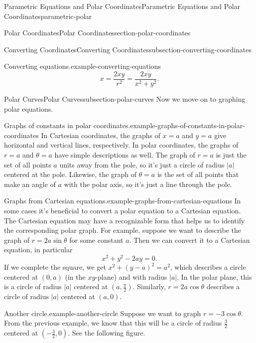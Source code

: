 \documentclass[oneside,10pt,]{book}
\numberwithin{equation}{section}
\begin{document}
\begin{chapterptx}{Parametric Equations and Polar Coordinates}{}{Parametric Equations and Polar Coordinates}{}{}{parametric-polar}
\begin{sectionptx}{Polar Coordinates}{}{Polar Coordinates}{}{}{section-polar-coordinates}
\begin{subsectionptx}{Converting Coordinates}{}{Converting Coordinates}{}{}{subsection-converting-coordinates}
\begin{example}{Converting equations.}{example-converting-equations}
\begin{equation*}
x = \frac{2xy}{r^{2}} = \frac{2xy}{x^{2}+y^{2}}.
\end{equation*}
\end{example}
\end{subsectionptx}
%
%
\typeout{************************************************}
\typeout{************************************************}
%
\begin{subsectionptx}{Polar Curves}{}{Polar Curves}{}{}{subsection-polar-curves}
\hypertarget{p-1027}{}%
Now we move on to graphing polar equations.%
\begin{example}{Graphs of constants in polar coordinates.}{example-graphs-of-constants-in-polar-coordinates}%
\hypertarget{p-1028}{}%
In Cartesian coordinates, the graphs of \(x=a\) and \(y=a\) give horizontal and vertical lines, respectively. In polar coordinates, the graphs of \(r=a\) and \(\theta=a\) have simple descriptions as well. The graph of \(r=a\) is just the set of all points \(a\) units away from the pole, so it's just a circle of radius \(|a|\) centered at the pole. Likewise, the graph of \(\theta = a\) is the set of all points that make an angle of \(a\) with the polar axis, so it's just a line through the pole.%
\end{example}
\begin{example}{Graphs from Cartesian equations.}{example-graphs-from-cartesian-equations}%
\hypertarget{p-1029}{}%
In some cases it's beneficial to convert a polar equation to a Cartesian equation. The Cartesian equation may have a recognizable form that helps us to identify the corresponding polar graph. For example, suppose we want to describe the graph of \(r = 2a\sin\theta\) for some constant \(a\). Then we can convert it to a Cartesian equation, in particular%
%
\begin{equation*}
x^{2}+y^{2} - 2ay = 0.
\end{equation*}
\hypertarget{p-1030}{}%
If we complete the square, we get \(x^{2}+(y-a)^{2} = a^{2}\), which describes a circle centered at \((0,a)\) (in the \(xy\)-plane) and with radius \(|a|\). In the polar plane, this is a circle of radius \(|a|\) centered at \((a,\frac{\pi}{2}).\) Similarly, \(r=2a\cos\theta\) describes a circle of radius \(|a|\) centered at \((a,0)\).%
\end{example}
\begin{example}{Another circle.}{example-another-circle}%
\hypertarget{p-1031}{}%
Suppose we want to graph \(r=-3\cos\theta\). From the previous example, we know that this will be a circle of radius \(\frac{3}{2}\) centered at \((-\frac{3}{2},0)\). See the following figure.%

\end{example}
\end{subsectionptx}
\end{sectionptx}
\end{chapterptx}
\end{document}
